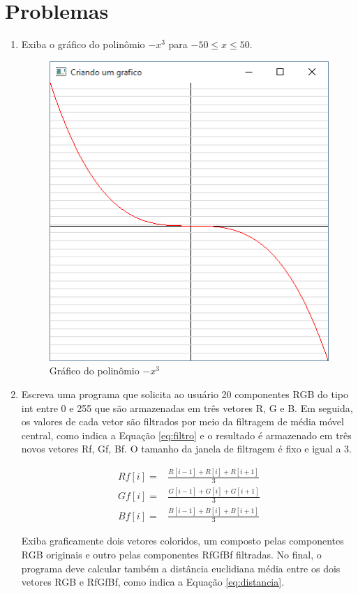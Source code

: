 \section*{Problemas}

\begin{enumerate}
\item
  Exiba o gráfico do polinômio $-x^3$ para $-50 \leq x \leq 50$.
  \label{ex:cap02_ex1}

  \begin{figure}[ht]
    \centerline{\includegraphics[width=.5\textwidth]{img/cap2_ex8.png}}
    \caption{Gráfico do polinômio $-x^3$}
    \label{fig:cap02_ex1}
  \end{figure}

\item
  Escreva uma programa que solicita ao usuário 20 componentes RGB do tipo int entre 0 e 255 que são armazenadas em três vetores R, G e B. Em seguida, os valores de cada vetor são filtrados por meio da filtragem de média móvel central, como indica a Equação \ref{eq:filtro} e o resultado é armazenado em três novos vetores Rf, Gf, Bf. O tamanho da janela de filtragem é fixo e igual a 3. 

  \label{ex:cap02_ex26}

\begin{equation} \label{eq:filtro}
\begin{matrix}
Rf[i] = & \frac{R[i-1] + R[i] + R[i+1]}{3}\\ 
Gf[i] = & \frac{G[i-1] + G[i] + G[i+1]}{3}\\ 
Bf[i] = & \frac{B[i-1] + B[i] + B[i+1]}{3}
\end{matrix}
\end{equation}

  Exiba graficamente dois vetores coloridos, um composto pelas componentes RGB originais e outro pelas componentes RfGfBf filtradas. No final, o programa deve calcular também a distância euclidiana média entre os dois vetores RGB e RfGfBf, como indica a Equação \ref{eq:distancia}.


\end{enumerate}
